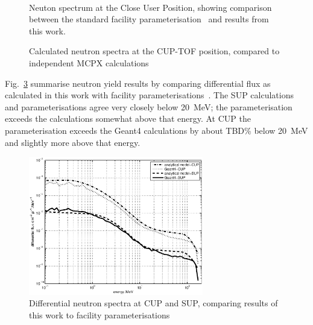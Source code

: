 \documentclass[11pt,a4paper]{IEEEtran}
\let\MYoriglatexcaption\caption
\renewcommand{\caption}[2][\relax]{\MYoriglatexcaption[#2]{#2}}
\begin{document}
\begin{figure}[t]
    \vspace{2in}
	\\
    \vspace{2in}
	\caption{Neuton spectrum at the Close User Position, showing comparison between the standard facility parameterisation~\cite{Prokofiev2009} and results from this work.}
	\label{fig:CUPSpectraComparison}
\end{figure}

\begin{figure}[t]
    \vspace{2in}
    \caption{Calculated neutron spectra at the CUP-TOF position, compared to independent MCPX calculations~\cite{Prokofiev14}}
    \label{fig:MCComparison}
\end{figure}

Fig.~\ref{fig:DifferentialSpectra} summarise neutron yield results by comparing differential flux as calculated in this work with facility parameterisations~\cite{Prokofiev2009,Prokofiev14}.
The SUP calculations and parameterisations agree very closely below \SI{20}{\MeV}; the parameterisation exceeds the calculations somewhat above that energy.
At CUP the parameterisation exceeds the Geant4 calculations by about TBD\% below \SI{20}{\MeV} and slightly more above that energy.

\begin{figure}[t]
    \centering
    \includegraphics[width=3in]{DiffYieldComparedSUPCUP10.eps}
    \caption{Differential neutron spectra at CUP and SUP, comparing results of this work to facility parameterisations~\cite{Prokofiev2009,Prokofiev14}}
    \label{fig:DifferentialSpectra}
\end{figure}
\end{document}
